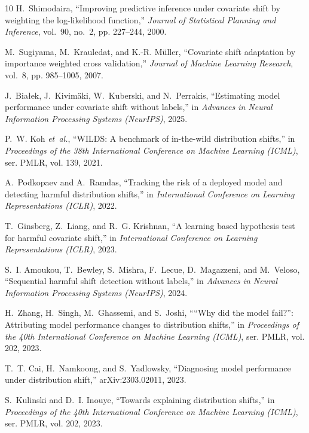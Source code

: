 \documentclass[conference]{IEEEtran}
\theoremstyle{plainhead}
\begin{document}
\begin{thebibliography}{10}
H.~Shimodaira, ``Improving predictive inference under covariate shift by
  weighting the log-likelihood function,'' \emph{Journal of Statistical
  Planning and Inference}, vol.~90, no.~2, pp. 227--244, 2000.

M.~Sugiyama, M.~Krauledat, and K.-R. M{\"u}ller, ``Covariate shift adaptation
  by importance weighted cross validation,'' \emph{Journal of Machine Learning
  Research}, vol.~8, pp. 985--1005, 2007.

J.~Bia{\l}ek, J.~Kivim{\"a}ki, W.~Kuberski, and N.~Perrakis, ``Estimating model
  performance under covariate shift without labels,'' in \emph{Advances in
  Neural Information Processing Systems (NeurIPS)}, 2025.

P.~W. Koh \emph{et~al.}, ``{WILDS}: A benchmark of in-the-wild distribution
  shifts,'' in \emph{Proceedings of the 38th International Conference on
  Machine Learning (ICML)}, ser. PMLR, vol. 139, 2021.

A.~Podkopaev and A.~Ramdas, ``Tracking the risk of a deployed model and
  detecting harmful distribution shifts,'' in \emph{International Conference on
  Learning Representations (ICLR)}, 2022.

T.~Ginsberg, Z.~Liang, and R.~G. Krishnan, ``A learning based hypothesis test
  for harmful covariate shift,'' in \emph{International Conference on Learning
  Representations (ICLR)}, 2023.

S.~I. Amoukou, T.~Bewley, S.~Mishra, F.~Lecue, D.~Magazzeni, and M.~Veloso,
  ``Sequential harmful shift detection without labels,'' in \emph{Advances in
  Neural Information Processing Systems (NeurIPS)}, 2024.

H.~Zhang, H.~Singh, M.~Ghassemi, and S.~Joshi, ````{W}hy did the model fail?'':
  Attributing model performance changes to distribution shifts,'' in
  \emph{Proceedings of the 40th International Conference on Machine Learning
  (ICML)}, ser. PMLR, vol. 202, 2023.

T.~T. Cai, H.~Namkoong, and S.~Yadlowsky, ``Diagnosing model performance under
  distribution shift,'' arXiv:2303.02011, 2023.

S.~Kulinski and D.~I. Inouye, ``Towards explaining distribution shifts,'' in
  \emph{Proceedings of the 40th International Conference on Machine Learning
  (ICML)}, ser. PMLR, vol. 202, 2023.


\end{thebibliography}
\end{document}
